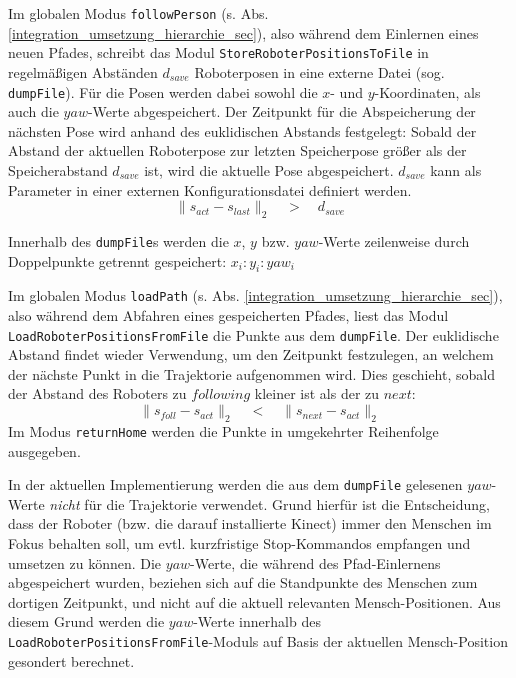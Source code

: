 Im globalen Modus \lstinline{followPerson} (s. Abs. \ref{integration_umsetzung_hierarchie_sec}), also während dem Einlernen eines neuen Pfades,
 schreibt das Modul \lstinline{StoreRoboterPositionsToFile} in regelmäßigen Abständen $d_{save}$ Roboterposen in eine externe Datei (sog. \lstinline{dumpFile}).
Für die Posen werden dabei sowohl die $x$- und $y$-Koordinaten, als auch die $yaw$-Werte abgespeichert.
Der Zeitpunkt für die Abspeicherung der nächsten Pose wird anhand des euklidischen Abstands festgelegt:
Sobald der Abstand der aktuellen Roboterpose zur letzten Speicherpose größer als der Speicherabstand $d_{save}$ ist, wird die aktuelle Pose abgespeichert.
$d_{save}$ kann als Parameter in einer externen Konfigurationsdatei definiert werden.
\begin{equation}
	\| s_{act} - s_{last}\|_2 \quad > \quad d_{save}
\end{equation}

Innerhalb des \lstinline{dumpFile}s werden die $x$, $y$ bzw. $yaw$-Werte zeilenweise durch Doppelpunkte getrennt gespeichert:
$x_i:y_i:yaw_i$

Im globalen Modus \lstinline{loadPath} (s. Abs. \ref{integration_umsetzung_hierarchie_sec}), also während dem Abfahren eines gespeicherten Pfades, liest das Modul \lstinline{LoadRoboterPositionsFromFile} die Punkte aus dem \lstinline{dumpFile}.
Der euklidische Abstand findet wieder Verwendung, um den Zeitpunkt festzulegen, an welchem der nächste Punkt in die Trajektorie aufgenommen wird.
Dies geschieht, sobald der Abstand des Roboters zu $following$ kleiner ist als der zu $next$:
\begin{equation}
	\| s_{foll} - s_{act} \|_2 \quad < \quad \| s_{next} - s_{act} \|_2
\end{equation}
Im Modus \lstinline{returnHome} werden die Punkte in umgekehrter Reihenfolge ausgegeben.

In der aktuellen Implementierung werden die aus dem \lstinline{dumpFile} gelesenen $yaw$-Werte \emph{nicht} für die Trajektorie verwendet.
Grund hierfür ist die Entscheidung, dass der Roboter (bzw. die darauf installierte Kinect) immer den Menschen im Fokus behalten soll, um evtl. kurzfristige Stop-Kommandos empfangen und umsetzen zu können.
Die $yaw$-Werte, die während des Pfad-Einlernens abgespeichert wurden, beziehen sich auf die Standpunkte des Menschen zum dortigen Zeitpunkt, und nicht auf die aktuell relevanten Mensch-Positionen. 
Aus diesem Grund werden die $yaw$-Werte innerhalb des \lstinline{LoadRoboterPositionsFromFile}-Moduls auf Basis der aktuellen Mensch-Position gesondert berechnet.

